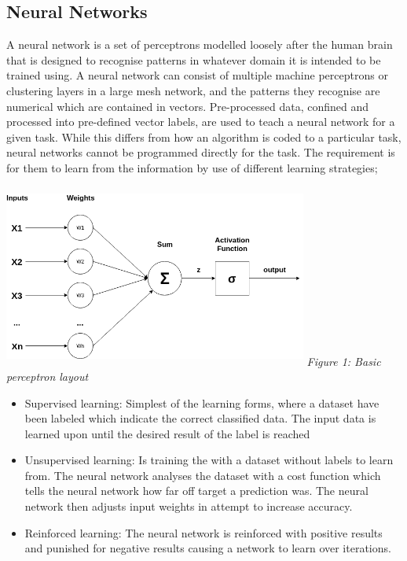 \documentclass[oneside, 12pt]{article}
\begin{document}
		\subsection{Neural Networks}\label{networks}
			A neural network is a set of perceptrons modelled loosely after the human brain that is designed to recognise patterns in whatever domain it is intended to be trained using. A neural network can consist of multiple machine perceptrons or clustering layers in a large mesh network, and the patterns they recognise are numerical which are contained in vectors. Pre-processed data, confined and processed into pre-defined vector labels, are used to teach a neural network for a given task. While this differs from how an algorithm is coded to a particular task, neural networks cannot be programmed directly for the task. The requirement is for them to learn from the information by use of different learning strategies; \cite{NNDLBegin}\cite{WhatNN}
			
			\begin{center}
				\includegraphics[width=10cm,height=6cm]{images/perceptron.png}
				\newline
				\textit{Figure 1: Basic perceptron layout}
			\end{center}
			
			\begin{itemize}
				\item Supervised learning: Simplest of the learning forms, where a dataset have been labeled which indicate the correct classified data. The input data is learned upon until the desired result of the label is reached \cite{SupdictL}
				\item Unsupervised learning: Is training the with a dataset without labels to learn from. The neural network analyses the dataset with a cost function which tells the neural network how far off target a prediction was. The neural network then adjusts input weights in attempt to increase accuracy. \cite{WhatNN}
				\item Reinforced learning: The neural network is reinforced with positive results and punished for negative results causing a network to learn over iterations. 
			\end{itemize}
		
\end{document}
